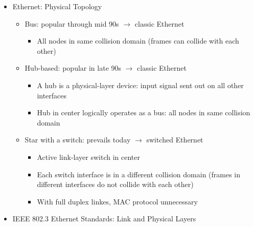 \begin{itemize}
  \item Ethernet: Physical Topology

    \begin{itemize}

      \item Bus: popular through mid 90s $\to$ classic Ethernet

        \begin{itemize}
            
          \item All nodes in same collision domain (frames can collide with each other)

        \end{itemize}

      \item Hub-based: popular in late 90s $\to$ classic Ethernet

        \begin{itemize}

          \item A hub is a physical-layer device: input signal sent out on all other interfaces

          \item Hub in center logically operates as a bus: all nodes in same collision domain

        \end{itemize}

      \item Star with a switch: prevails today $\to$ switched Ethernet

        \begin{itemize}

          \item Active link-layer switch in center

          \item Each switch interface is in a different collision domain (frames in different interfaces do not collide with each other)

          \item With full duplex linkes, MAC protocol unnecessary

        \end{itemize}

    \end{itemize}

  \item IEEE 802.3 Ethernet Standards: Link and Physical Layers

    \begin{itemize}


\end{itemize}
\end{itemize}
